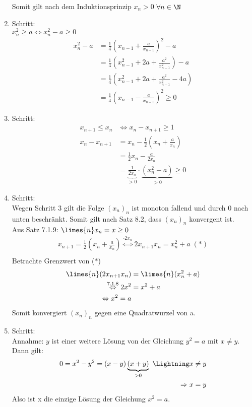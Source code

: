 \documentclass[12pt,a4paper,titlepage,draft]{article}
\begin{document}
\begin{bsp}
\begin{bew}
\begin{enumerate}
					Somit gilt nach dem Induktionsprinzip \(x_n > 0\) \(\forall n \in \N\)
				\item Schritt:\\
					\(x_n^2 \geq a \Leftrightarrow x_n^2 - a \geq 0 \)
					\begin{align*}
						x_n^2 - a &= \frac{1}{4}\left(x_{n-1} + \frac{a}{x_{n-1}}\right)^2 - a\\
						&= \frac{1}{4}\left(x_{n-1}^2 + 2a + \frac{a^2}{x_{n-1}^2}\right) - a\\
						&= \frac{1}{4}\left(x_{n-1}^2 + 2a + \frac{a^2}{x_{n-1}^2} - 4a\right)\\
						&= \frac{1}{4}\left(x_{n-1} - \frac{a}{x_{n-1}}\right)^2 \geq 0
					\end{align*}
				\item Schritt:\\
					\begin{align*}
						x_{n+1} \leq x_n &\Leftrightarrow x_n - x_{n+1} \geq 1\\
						x_n - x_{n+1} &= x_n - \frac{1}{2}(x_n + \frac{a}{x_n})\\
						&=\frac{1}{2}x_n - \frac{a}{2x_n}\\
						&= \underbrace{\frac{1}{2x_n}}_{>0} \cdot \underbrace{(x_n^2 - a)}_{>0} \geq 0
					\end{align*}
				\item Schritt:\\
					Wegen Schritt 3 gilt die Folge \((x_n)_n\) ist monoton fallend und durch 0 nach unten beschränkt. Somit gilt nach Satz 8.2, dass \((x_n)_n\) konvergent ist.\\
					Aus Satz 7.1.9:
					\(\limes{n} x_n = x \geq 0\)
					\begin{align*}
						x_{n+1} = \frac{1}{2}(x_n + \frac{a}{x_n}) \overset{\cdot 2x_n} {\Leftrightarrow} 2x_{n+1}x_n = x_n^2 + a \;(\ast)\\						
					\end{align*}
					Betrachte Grenzwert von (\(\ast\))
					\begin{align*}
						\limes{n} (2x_{n+1}x_n) &= \limes{n} (x_n^2 + a)\\
						\overset{\text{7.1.8}}{\Leftrightarrow} 2x^2 &= x^2 + a\\
						\Leftrightarrow x^2 = a						
					\end{align*}
					Somit konvergiert \((x_n)_n\) gegen eine Quadratwurzel von a.
				\item Schritt:\\
					Annahme: \(y\) ist einer weitere Lösung von der Gleichung \(y^2 = a\) mit \(x \neq y\).\\
					Dann gilt:
					\begin{align*}
						0 = x^2 - y^2 = (x-y)\underbrace{(x+y)}_{>0} \text{ \Lightning} x \neq y\\
						\Rightarrow x = y
					\end{align*}
					Also ist x die einzige Lösung der Gleichung \(x^2 = a\).
			\end{enumerate}
		\end{bew}

\end{bsp}
\end{document}
